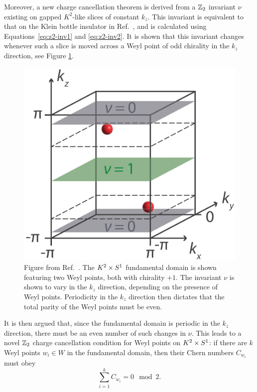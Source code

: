 Moreover, a new charge cancellation theorem is derived from a $\mathbb{Z}_2$ invariant $\nu$ existing on gapped $K^2$-like slices of constant $k_z$. This invariant is equivalent to that on the Klein bottle insulator in Ref.~\cite{CYZ_Klein-gauge}, and is calculated using Equations~\eqref{eq:z2-inv1} and \eqref{eq:z2-inv2}. It is shown that this invariant changes whenever such a slice is moved across a Weyl point of odd chirality in the $k_z$ direction, see Figure \ref{fig:Z2-cancellation}.
\begin{figure}[htb!]
	\centering
	\includegraphics[width=.5\linewidth]{Images/Z2-cancellation}
	\caption{Figure from Ref.~\cite{Fonseca-Vaidya_nonorientable}. The $K^2\times S^1$ fundamental domain is shown featuring two Weyl points, both with chirality $+1$. The invariant $\nu$ is shown to vary in the $k_z$ direction, depending on the presence of Weyl points. Periodicity in the $k_z$ direction then dictates that the total parity of the Weyl points must be even.}
	\label{fig:Z2-cancellation}
\end{figure}
It is then argued that, since the fundamental domain is periodic in the $k_z$ direction, there must be an even number of such changes in $\nu$. This leads to a novel $\mathbb{Z}_2$ charge cancellation condition for Weyl points on $K^2\times S^1$: if there are $k$ Weyl points $w_i\in W$ in the fundamental domain, then their Chern numbers $C_{w_i}$ must obey
\begin{equation}\label{eq:Z2-cancellation}
	\sum_{i=1}^{k}C_{w_i} = 0 \mod 2.
\end{equation}

